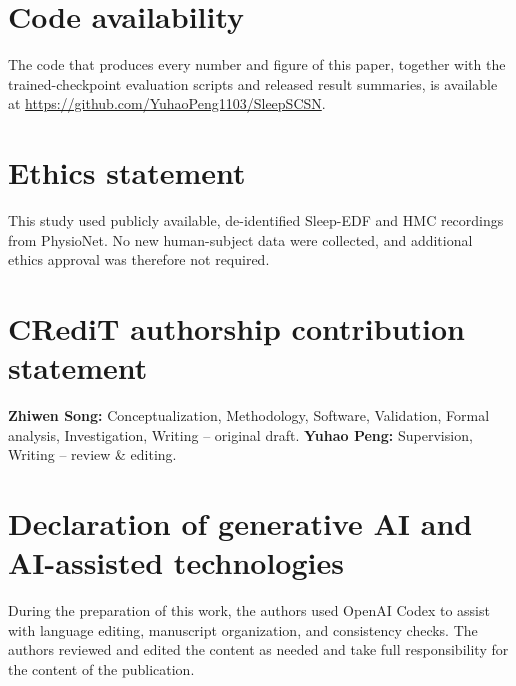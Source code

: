 \documentclass[preprint,12pt]{elsarticle}
\theoremstyle{definition}
\theoremstyle{remark}
\begin{document}
\section*{Code availability}
The code that produces every number and figure of this paper, together with
the trained-checkpoint evaluation scripts and released result summaries, is
available at \url{https://github.com/YuhaoPeng1103/SleepSCSN}.

\section*{Ethics statement}
This study used publicly available, de-identified Sleep-EDF and HMC recordings
from PhysioNet. No new human-subject data were collected, and additional
ethics approval was therefore not required.

\section*{CRediT authorship contribution statement}
\textbf{Zhiwen Song:} Conceptualization, Methodology, Software, Validation,
Formal analysis, Investigation, Writing -- original draft. \textbf{Yuhao
Peng:} Supervision, Writing -- review \& editing.

\section*{Declaration of generative AI and AI-assisted technologies}
During the preparation of this work, the authors used OpenAI Codex to assist
with language editing, manuscript organization, and consistency checks. The
authors reviewed and edited the content as needed and take full responsibility
for the content of the publication.


\end{document}
